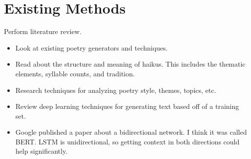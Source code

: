 \section{Existing Methods}\label{sec:methods}

{\color{red}
    Perform literature review.

    \begin{itemize}
        \item Look at existing poetry generators and techniques.
        \item Read about the structure and meaning of haikus. This includes the
              thematic elements, syllable counts, and tradition.
        \item Research techniques for analyzing poetry style, themes, topics,
              etc.
        \item Review deep learning techniques for generating text based off of
              a training set.
        \item Google published a paper about a bidirectional network. I think
              it was called BERT. LSTM is unidirectional, so getting context in
              both directions could help significantly.
    \end{itemize}
}
